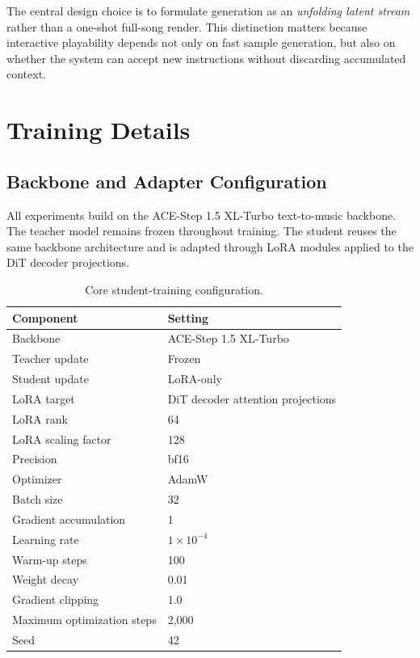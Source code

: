 \documentclass[11pt]{article}
\begin{document}
The central design choice is to formulate generation as an \emph{unfolding latent stream} rather than a one-shot full-song render. This distinction matters because interactive playability depends not only on fast sample generation, but also on whether the system can accept new instructions without discarding accumulated context.

\section{Training Details}

\subsection{Backbone and Adapter Configuration}

All experiments build on the ACE-Step 1.5 XL-Turbo text-to-music backbone. The teacher model remains frozen throughout training. The student reuses the same backbone architecture and is adapted through LoRA modules applied to the DiT decoder projections.

\begin{table}[H]
\centering
\caption{Core student-training configuration.}
\label{tab:supp_train_config}
\begin{tabular}{@{}ll@{}}
\toprule
\textbf{Component} & \textbf{Setting} \\
\midrule
Backbone & ACE-Step 1.5 XL-Turbo \\
Teacher update & Frozen \\
Student update & LoRA-only \\
LoRA target & DiT decoder attention projections \\
LoRA rank & 64 \\
LoRA scaling factor & 128 \\
Precision & bf16 \\
Optimizer & AdamW \\
Batch size & 32 \\
Gradient accumulation & 1 \\
Learning rate & \(1\times10^{-4}\) \\
Warm-up steps & 100 \\
Weight decay & 0.01 \\
Gradient clipping & 1.0 \\
Maximum optimization steps & 2,000 \\
Seed & 42 \\
\bottomrule
\end{tabular}
\end{table}
\end{document}
